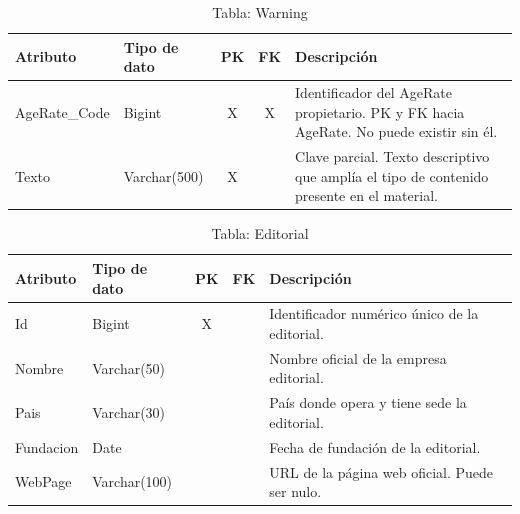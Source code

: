 \documentclass[12pt,a4paper]{article}
\begin{document}
\begin{table}[H]
\centering
\begin{tabularx}{\textwidth}{|l|l|c|c|X|}
\hline
\textbf{Atributo} & \textbf{Tipo de dato} & \textbf{PK} & \textbf{FK} & \textbf{Descripción} \\ \hline
AgeRate\_Code & Bigint       & X & X & Identificador del AgeRate propietario. PK y FK hacia AgeRate. No puede existir sin él. \\ \hline
Texto         & Varchar(500) & X & & Clave parcial. Texto descriptivo que amplía el tipo de contenido presente en el material. \\ \hline
\end{tabularx}
\caption{Tabla: Warning}
\end{table}


\begin{table}[H]
\centering
\begin{tabularx}{\textwidth}{|l|l|c|c|X|}
\hline
\textbf{Atributo} & \textbf{Tipo de dato} & \textbf{PK} & \textbf{FK} & \textbf{Descripción} \\ \hline
Id        & Bigint       & X & & Identificador numérico único de la editorial. \\ \hline
Nombre    & Varchar(50)  & & & Nombre oficial de la empresa editorial. \\ \hline
Pais      & Varchar(30)  & & & País donde opera y tiene sede la editorial. \\ \hline
Fundacion & Date         & & & Fecha de fundación de la editorial. \\ \hline
WebPage   & Varchar(100) & & & URL de la página web oficial. Puede ser nulo. \\ \hline
\end{tabularx}
\caption{Tabla: Editorial}
\end{table}
\end{document}

